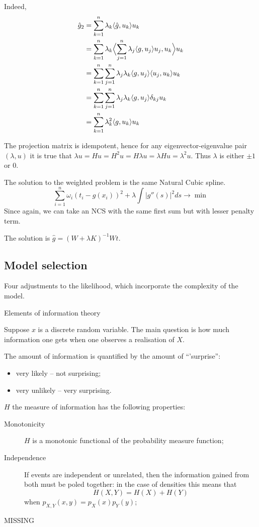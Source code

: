 \documentclass[a4paper]{article}
\newcommand{\brac}[1]{{\left ( #1 \right )}}
\newcommand{\abs}[1]{{\left | #1 \right |}}
\begin{document}
Indeed, \begin{align*}
	\hat{g}_2 & = \sum_{k=1}^n \lambda_k \langle\hat{g}, u_k\rangle u_k \\
	& = \sum_{k=1}^n \lambda_k \Bigl\langle \sum_{j=1}^n \lambda_j \langle g, u_j\rangle u_j, u_k\Bigr\rangle u_k \\
	& = \sum_{k=1}^n \sum_{j=1}^n \lambda_j \lambda_k \langle g, u_j\rangle \langle u_j, u_k\rangle u_k \\
	& = \sum_{k=1}^n \sum_{j=1}^n \lambda_j \lambda_k \langle g, u_j\rangle \delta_{kj} u_k \\
	& = \sum_{k=1}^n \lambda_k^2 \langle g, u_k\rangle u_k
\end{align*}

The projection matrix is idempotent, hence for any eigenvector-eigenvalue pair $(\lambda, u)$ it is true that $\lambda u = Hu = H^2u = H\lambda u = \lambda Hu = \lambda^2 u$. Thus $\lambda$ is either $\pm1$ or $0$.

The solution to the weighted problem is the same Natural Cubic spline.
\[\sum_{i=1}^n \omega_i \brac{t_i - g(x_i)}^2 + \lambda \int \abs{g''(s)}^2 ds \to \min\]
Since again, we can take an NCS with the same first sum but with lesser penalty term.

The solution is $\hat{g} = \brac{W+\lambda K}^{-1} Wt$.

\subsection{Model selection} %
\label{sub:model_selection}


Four adjustments to the likelihood, which incorporate the complexity of the model.

Elements of information theory

Suppose $x$ is a discrete random variable.
The main question is how much information one gets when one observes a realisation of $X$.

The amount of information is quantified by the amount of ``'surprise'':\begin{itemize}
	\item very likely -- not surprising;
	\item very unlikely -- very surprising.
\end{itemize}

$H$ the measure of information has the following properties: \begin{description}
	\item[Monotonicity] $H$ is a monotonic functional of the probability measure function;
	\item[Independence] If events are independent or unrelated, then the information gained from both must be poled together: in the case of densities this means that
\[H(X,Y) = H(X)+H(Y)\]
when $p_{X,Y}(x,y) = p_X(x) p_Y(y)$;
	\item[MISSING]
\end{description}
\end{document}
